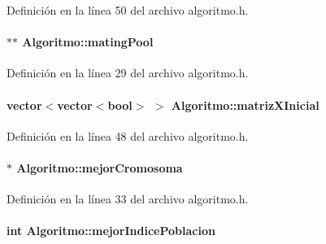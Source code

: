 Definición en la línea 50 del archivo algoritmo.\-h.

\hypertarget{class_algoritmo_a9c6c102ca50a3d69052d3c06ef19725c}{
\paragraph[{mating\-Pool}]{$\ast$$\ast$ Algoritmo\-::mating\-Pool\hspace{0.3cm}{\ttfamily [private]}}}\label{class_algoritmo_a9c6c102ca50a3d69052d3c06ef19725c}


Definición en la línea 29 del archivo algoritmo.\-h.

\hypertarget{class_algoritmo_a2d2c192209608ebd713ccdd2460a1778}{
\paragraph[{matriz\-X\-Inicial}]{\setlength{\rightskip}{0pt plus 5cm}vector$<$vector$<$bool$>$ $>$ Algoritmo\-::matriz\-X\-Inicial\hspace{0.3cm}{\ttfamily [private]}}}\label{class_algoritmo_a2d2c192209608ebd713ccdd2460a1778}


Definición en la línea 48 del archivo algoritmo.\-h.

\hypertarget{class_algoritmo_a2bb44f3dd4096ece8959ed32b05b5147}{
\paragraph[{mejor\-Cromosoma}]{$\ast$ Algoritmo\-::mejor\-Cromosoma\hspace{0.3cm}{\ttfamily [private]}}}\label{class_algoritmo_a2bb44f3dd4096ece8959ed32b05b5147}


Definición en la línea 33 del archivo algoritmo.\-h.

\hypertarget{class_algoritmo_aeda95cdb4165c41656c1a3e2e157eb51}{
\paragraph[{mejor\-Indice\-Poblacion}]{\setlength{\rightskip}{0pt plus 5cm}int Algoritmo\-::mejor\-Indice\-Poblacion\hspace{0.3cm}{\ttfamily [private]}}}\label{class_algoritmo_aeda95cdb4165c41656c1a3e2e157eb51}


